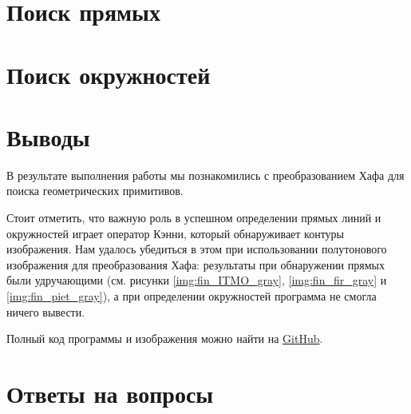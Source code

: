 \section{Поиск прямых}



\section{Поиск окружностей}


\section{Выводы}

В результате выполнения работы мы познакомились с преобразованием Хафа для поиска геометрических примитивов.

Стоит отметить, что важную роль в успешном определении прямых линий и окружностей играет оператор Кэнни, который обнаруживает контуры изображения. Нам удалось убедиться в этом при использовании полутонового изображения для преобразования Хафа: результаты при обнаружении прямых были удручающими (см. рисунки \ref*{img:fin_ITMO_gray}, \ref*{img:fin_fir_gray} и \ref*{img:fin_piet_gray}), а при определении окружностей программа не смогла ничего вывести.

Полный код программы и изображения можно найти на \href{https://github.com/NikBrat/ComputerVision_Lab5}{GitHub}.

\section{Ответы на вопросы}

\setcounter{question}{0}

\newcommand{\question}[1]{\item[Q\refstepcounter{question}\thequestion.] #1}
\newcommand{\answer}[1]{\item[A\thequestion.] #1}


